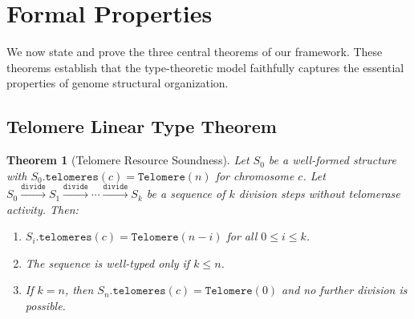 \documentclass[12pt,a4paper]{article}
\theoremstyle{plain}
\newtheorem{theorem}{Theorem}[section]
\theoremstyle{definition}
\begin{document}
\section{Formal Properties}\label{sec:formal}

We now state and prove the three central theorems of our framework. These theorems establish that the type-theoretic model faithfully captures the essential properties of genome structural organization.

\subsection{Telomere Linear Type Theorem}

\begin{theorem}[Telomere Resource Soundness]\label{thm:telomere}
Let $S_0$ be a well-formed structure with $S_0.\texttt{telomeres}(c) = \texttt{Telomere}(n)$ for chromosome $c$. Let $S_0 \xrightarrow{\texttt{divide}} S_1 \xrightarrow{\texttt{divide}} \cdots \xrightarrow{\texttt{divide}} S_k$ be a sequence of $k$ division steps without telomerase activity. Then:
\begin{enumerate}[label=(\alph*)]
  \item $S_i.\texttt{telomeres}(c) = \texttt{Telomere}(n - i)$ for all $0 \leq i \leq k$.
  \item The sequence is well-typed only if $k \leq n$.
  \item If $k = n$, then $S_n.\texttt{telomeres}(c) = \texttt{Telomere}(0)$ and no further division is possible.
\end{enumerate}
\end{theorem}
\end{document}
